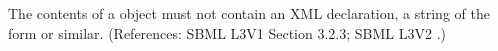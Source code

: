 The contents of a \Notes object must not contain an XML declaration, \ie
a string of the form  or
similar.  (References: SBML L3V1 Section 3.2.3; SBML L3V2 .)
